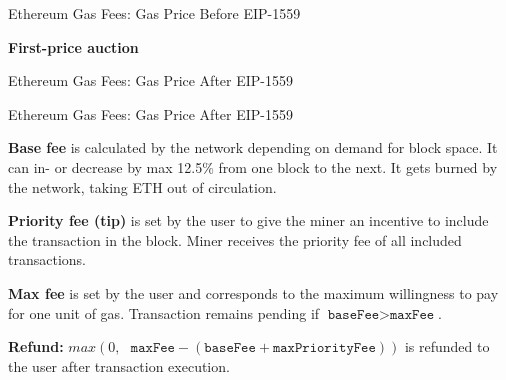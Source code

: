\documentclass[handout]{beamer}
\begin{document}
\begin{frame}{Ethereum Gas Fees: Gas Price Before EIP-1559}
	\begin{center}
		\begin{tikzpicture}
			
		\end{tikzpicture}
	\end{center}
	
	\textbf{First-price auction}
	\begin{itemize}
	\end{itemize}
\end{frame}

\begin{frame}{Ethereum Gas Fees: Gas Price After EIP-1559}
	\begin{center}
		\begin{tikzpicture}
			
		\end{tikzpicture}
	\end{center}	
\end{frame}

\begin{frame}{Ethereum Gas Fees: Gas Price After EIP-1559}

\textbf{Base fee} is calculated by the network depending on demand for block space. It can in- or decrease by max 12.5\% from one block to the next. It gets burned by the network, taking ETH out of circulation.
\vspace{1 em}

\textbf{Priority fee (tip)} is set by the user to give the miner an incentive to include the transaction in the block. Miner receives the priority fee of all included transactions.
\vspace{1 em}

\textbf{Max fee} is set by the user and corresponds to the maximum willingness to pay for one unit of gas. Transaction remains pending if $\texttt{baseFee}  > \texttt{maxFee} $.
\vspace{1 em}

\textbf{Refund:} $max \left(0, \text{ }\texttt{maxFee} - (\texttt{baseFee}  + \texttt{maxPriorityFee} )\right)$ is refunded to the user after transaction execution. 
	
\end{frame}
\end{document}
